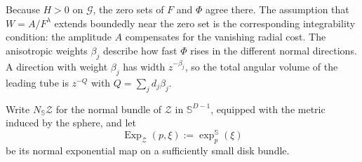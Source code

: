 \documentclass[11pt]{amsart}
\numberwithin{equation}{section}
\theoremstyle{definition}
\theoremstyle{remark}
\begin{document}
Because $H>0$ on $\mathcal G$, the zero sets of $F$ and $\Phi$ agree there.
The assumption that $W=A/F^\lambda$ extends boundedly near the zero set is the
corresponding integrability condition: the amplitude $A$ compensates for the
vanishing radial cost.  The anisotropic weights $\beta_j$ describe how fast
$\Phi$ rises in the different normal directions.  A direction with weight
$\beta_j$ has width $z^{-\beta_j}$, so the total angular volume of the
leading tube is $z^{-Q}$ with $Q=\sum_j d_j\beta_j$.

Write $N_{\mathbb S}\mathcal Z$ for the normal bundle of $\mathcal Z$ in
$\mathbb S^{D-1}$, equipped with the metric induced by the sphere, and let
\[
 \operatorname{Exp}_{\mathcal Z}(p,\xi):=\exp_p^{\mathbb S}(\xi)
\]
be its normal exponential map on a sufficiently small disk bundle.
\end{document}
